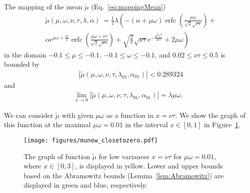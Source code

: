 \documentclass{article}
\newcommand\munn{{\tilde \mu}}
\renewcommand{\leq}{\leqslant}
\DeclareMathOperator{\erfc}{erfc}
\begin{document}
\begin{lemma}
\label{lem:meanLowVar}
The mapping of the mean $\munn$ (Eq.~\eqref{eq:mappingMean}) 
\begin{align}
&\munn(\mu,\omega,\nu,\tau, \lambda ,\alpha ) \
  = \frac{1}{2} \lambda  \left(-(\alpha +\mu  \omega ) \erfc \left(\frac{\mu  \omega }{\sqrt{2} \sqrt{\nu  \tau }}\right)+ \right. \\ \nonumber & \left.
    \alpha  e^{\mu  \omega +\frac{\nu  \tau }{2}} \erfc 
    \left(\frac{\mu  \omega +\nu  \tau }{\sqrt{2} \sqrt{\nu  \tau }}\right)+ 
    \sqrt{\frac{2}{\pi }} \sqrt{\nu  \tau } e^{-\frac{\mu ^2 \omega ^2}{2 \nu  \tau }}+2 \mu  \omega \right) 
\end{align}
in the domain $-0.1 \leq \mu \leq -0.1$,  $-0.1 \leq \omega \leq -0.1$,
and $0.02 \leq \nu \tau \leq 0.5$ is bounded by  
\begin{align}
&| \munn(\mu,\omega,\nu,\tau, \lambda_{\mathrm{01}} ,\alpha_{\mathrm{01}} ) | < 0.289324
\end{align}
and
\begin{align}
 \lim_{\nu \rightarrow 0} | \munn(\mu,\omega,\nu,\tau, \lambda_{\mathrm{01}} ,\alpha_{\mathrm{01}} ) | = \lambda \mu \omega.
\end{align}
\end{lemma}

We can consider $\munn$ with given $\mu \omega$ as a function in $x = \nu \tau$. We show the graph of this function at the
maximal $\mu \omega=0.01$ in the interval $x \in [0, 1]$ in Figure~\ref{fig:meanAtLowVar}.

\begin{figure}
  \centering
 \texttt{[image: figures/munew\_closetozero.pdf]}
 \caption[The graph of function $\munn$ for low variances]{The graph of function $\munn$ for low variances $x=\nu \tau$ for $\mu \omega=0.01$, where $x \in [0, 3]$, is
 displayed in yellow. 
 Lower and upper bounds based on the Abramowitz bounds (Lemma~\ref{lem:Abramowitz}) are displayed in green and blue, respectively. 
 \label{fig:meanAtLowVar}}
\end{figure}
\end{document}
